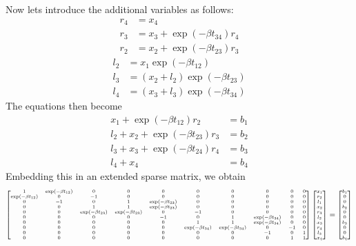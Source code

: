 \documentclass[times]{nlaauth}
\begin{document}
Now lets introduce the additional variables as follows:
\begin{align}
r_4 & = x_4\\
r_3 & = x_3 + \exp(-\beta t_{34})r_4\\
r_2 & = x_2 + \exp(-\beta t_{23})r_3
\end{align}
\begin{align}
l_2 & = x_1\exp(-\beta t_{12})\\
l_3 & = (x_2+l_2)\exp(-\beta t_{23})\\
l_4 & = (x_3+l_3)\exp(-\beta t_{34})
\end{align}
The equations then become
\begin{align}
x_1 + \exp(-\beta t_{12}) r_2 & = b_1\\
l_2 + x_2 + \exp(-\beta t_{23}) r_3 & = b_2\\
l_3 + x_3 + \exp(-\beta t_{24}) r_4 & = b_3\\
l_4 + x_4 & = b_4
\end{align}
Embedding this in an extended sparse matrix, we obtain
\begin{align}
	\tiny
\begin{bmatrix}
1 & \exp(-\beta t_{12}) & 0 & 0 & 0 & 0 & 0 & 0 & 0 & 0\\
\exp(-\beta t_{12}) & 0 & -1 & 0 & 0 & 0 & 0 & 0 & 0 & 0\\
0 & -1 & 0 & 1 & \exp(-\beta t_{23}) & 0 & 0 & 0 & 0 & 0\\
0 & 0 & 1 & 1 & \exp(-\beta t_{23}) & 0 & 0 & 0 & 0 & 0\\
0 & 0 & \exp(-\beta t_{23}) & \exp(-\beta t_{23}) & 0 & -1 & 0 & 0 & 0 & 0\\
0 & 0 & 0 & 0 & -1 & 0 & 1 & \exp(-\beta t_{34}) & 0 & 0\\
0 & 0 & 0 & 0 & 0 & 1 & 1 & \exp(-\beta t_{34}) & 0 & 0\\
0 & 0 & 0 & 0 & 0 & \exp(-\beta t_{34}) & \exp(-\beta t_{34}) & 0 & -1 & 0\\
0 & 0 & 0 & 0 & 0 & 0 & 0 & -1 & 0 & 1\\
0 & 0 & 0 & 0 & 0 & 0 & 0 & 0 & 1 & 1\\
\end{bmatrix}
\begin{bmatrix}
x_1\\ r_2\\ l_1\\ x_2\\ r_3\\ l_2\\ x_3\\ r_4\\ l_3\\ x_4
\end{bmatrix}
=
\begin{bmatrix}
b_1\\ 0\\ 0\\ b_2\\ 0\\ 0\\ b_3\\ 0\\ 0\\ b_4
\end{bmatrix}
\end{align}
\end{document}
